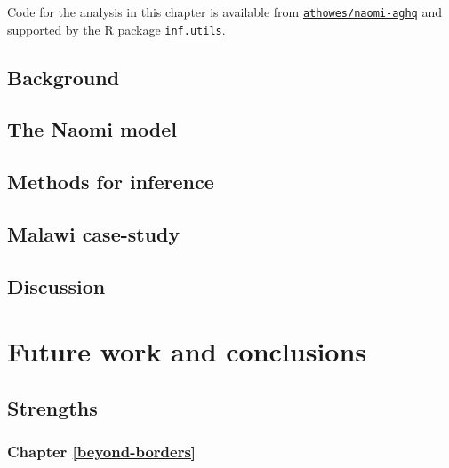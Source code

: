 \documentclass[a4paper, nobind]{templates/ociamthesis}
\begin{document}
Code for the analysis in this chapter is available from \href{https://github.com/athowes/elgm-inf}{\texttt{athowes/naomi-aghq}} and supported by the R package \href{https://athowes.github.io/inf.utils}{\texttt{inf.utils}}.

\hypertarget{background-3}{%
\section{Background}\label{background-3}}

\hypertarget{the-naomi-model}{%
\section{The Naomi model}\label{the-naomi-model}}

\hypertarget{methods-for-inference}{%
\section{Methods for inference}\label{methods-for-inference}}

\hypertarget{malawi-case-study}{%
\section{Malawi case-study}\label{malawi-case-study}}

\hypertarget{discussion-2}{%
\section{Discussion}\label{discussion-2}}

\hypertarget{conclusions}{%
\chapter{Future work and conclusions}\label{conclusions}}

\adjustmtc
{}

\hypertarget{strengths}{%
\section{Strengths}\label{strengths}}

\hypertarget{chapter-refbeyond-borders}{%
\subsection{Chapter \ref{beyond-borders}}\label{chapter-refbeyond-borders}}
\end{document}
